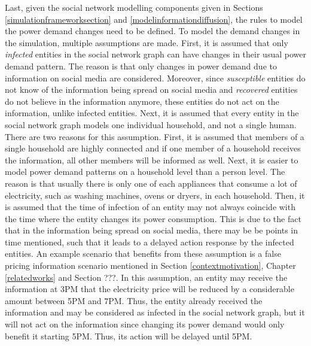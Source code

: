 Last, given the social network modelling components given in 
Sections \ref{simulationframeworksection} and 
\ref{modelinformationdiffusion}, the rules to model the
power demand changes need to be defined.
To model the demand changes in the simulation, multiple assumptions
are made.
First, it is assumed that only \textit{infected} entities in 
the social network graph
can have changes in their usual power demand pattern. The reason is 
that only changes in power demand due to information on social media
are considered. Moreover, since \textit{susceptible} entities
do not know of the information being spread on social media and 
\textit{recovered} entities do not believe in the information anymore,
these entities do not act on the information, unlike infected
entities.
Next, it is assumed that every entity in the social network graph 
models one individual household, and not a single human. There are 
two reasons for this assumption. First, it is assumed that 
members of a single household are highly connected and if one 
member of a household receives the information, all other members
will be informed as well. Next, it is easier to model power demand
patterns on a household level than a person level. The reason
is that usually
there is only one of each appliances that consume a lot of electricity, 
such as washing machines, ovens or dryers, in each household.
Then, it is assumed that the time of infection of an entity may not
always coincide with the time where the entity changes its 
power consumption. This is due to the fact that in the information
being spread on social media, there may be be points in time
mentioned, such that it leads to a delayed action response by the
infected entities. An example scenario that benefits
from these assumption is a false pricing information scenario 
mentioned in Section \ref{contextmotivation}, Chapter 
\ref{relatedworks} and Section ???. %
In this assumption, an entity may receive the information 
at 3PM that the electricity price will be reduced by a considerable
amount between 5PM and 7PM. Thus, the entity already received the
information and may be considered as infected in the social network
graph, but it will not act on the information since changing
its power demand would only benefit it starting 5PM. Thus, its 
action will be delayed until 5PM. 

